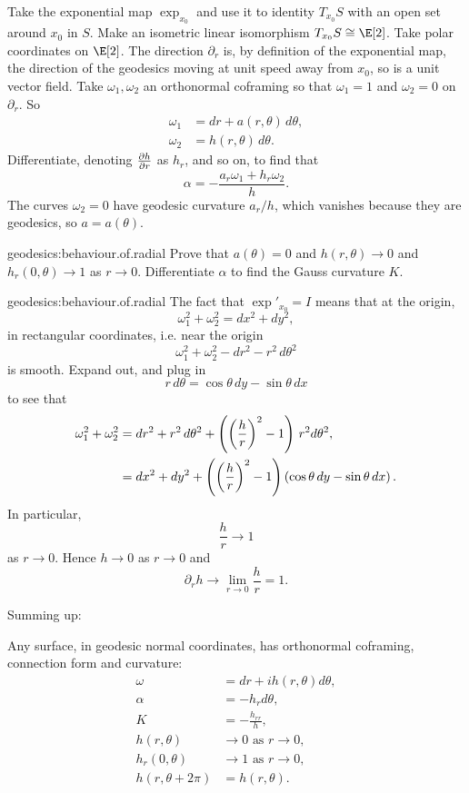Take the exponential map \(\exp_{x_0}\) and use it to identity \(T_{x_0} S\) with an open set around \(x_0\) in \(S\).
Make an isometric linear isomorphism \(T_{x_0} S \cong \E[2]\).
Take polar coordinates on \(\E[2]\).
The direction \(\partial_r\) is, by definition of the exponential map, the direction of the geodesics moving at unit speed away from \(x_0\), so is a unit vector field.
Take \(\omega_1,\omega_2\) an orthonormal coframing so that \(\omega_1=1\) and \(\omega_2=0\) on \(\partial_r\).
So
\begin{align*}
\omega_1 &= dr + a(r,\theta) \, d\theta, \\
\omega_2 &= h(r,\theta) \, d\theta.
\end{align*}
Differentiate, denoting \(\pderiv{h}{r}\) as \(h_r\), and so on, to find that
\[
\alpha = -\frac{a_r\omega_1+h_r\omega_2}{h}.
\]
The curves \(\omega_2=0\) have geodesic curvature  \(a_r/h\), which vanishes because they are geodesics, so \(a=a(\theta)\).

\begin{problem*}{geodesics:behaviour.of.radial}
Prove that \(a(\theta)=0\) and \(h(r,\theta) \to 0\) and \(h_r(0,\theta) \to 1\) as \(r \to 0\).
Differentiate \(\alpha\) to find the Gauss curvature \(K\).
\end{problem*}
\begin{answer}{geodesics:behaviour.of.radial}
The fact that \(\exp'_{x_0}=I\) means that at the origin,
\[
\omega_1^2 + \omega_2^2 = dx^2 + dy^2,
\]
in rectangular coordinates, i.e. near the origin
\[
\omega_1^2 + \omega_2^2 - dr^2 - r^2 \, d\theta^2
\]
is smooth.
Expand out, and plug in 
\[
r \, d\theta= \cos \theta  \, dy - \sin \theta \, dx
\]
to see that
\begin{align*}
\omega_1^2 + \omega_2^2 
&= 
dr^2 + r^2 \, d\theta^2 + \left(\left(\frac{h}{r}\right)^2-1\right) \, r^2 d\theta^2,
\\
&=dx^2 + dy^2 +  \left(\left(\frac{h}{r}\right)^2-1\right) \left(\cos \theta  \, dy - \sin \theta \, dx\right).
\end{align*}
In particular, 
\[
\frac{h}{r} \to 1
\]
as \(r \to 0\).
Hence \(h \to 0\) as  \(r \to 0\) and 
\[
\partial_r h \to \lim_{r \to 0} \frac{h}{r} = 1.
\]
\end{answer}


Summing up:
\begin{lemma}
Any surface, in geodesic normal coordinates, has orthonormal coframing, connection form and curvature:
\begin{align*}
\omega &= dr+ih(r,\theta) d\theta, \\
\alpha &= -h_r d\theta, \\
K &= - \frac{h_{rr}}{h}, \\
h(r,\theta)&\to 0 \text{ as } r \to 0, \\
h_r(0,\theta) &\to 1 \text{ as } r \to 0, \\
h(r,\theta+2\pi)&=h(r,\theta).
\end{align*}
\end{lemma}

